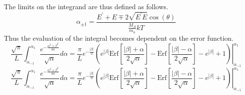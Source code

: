 The limits on the integrand are thus defined as follows.
\begin{equation}
\label{app_alpha_limits}
\alpha_{\pm 1} = \frac{E^\prime + E \mp 2\sqrt{E^\prime E}\cos(\theta)}{\frac{M_A}{m_n}kT}
\end{equation}
Thus the evaluation of the integral becomes dependent on the error function.
\begin{equation}
\label{app_int_ke_3}
\frac{\sqrt{\pi}}{L} \int_{\alpha_{-1}}^{\alpha_1} \frac{e^{-\frac{\alpha^2 + \beta^2}{4\alpha}}}{\sqrt{\alpha}} d\alpha = 
    \frac{\pi}{L} e^{-\frac{|\beta|}{2}} \left. \left(
    e^{|\beta|} \mbox{Erf}\left[\frac{|\beta| + \alpha}{2\sqrt{\alpha}}\right] - 
    \mbox{Erf}\left[\frac{|\beta| - \alpha}{2\sqrt{\alpha}}\right] - 
    e^{|\beta|} + 1
    \right) \right|_{\alpha_{-1}}^{\alpha_1}
\end{equation}
\begin{equation}
\label{app_int_ke_3}
\frac{\sqrt{\pi}}{L} \int_{\alpha_{-1}}^{\alpha_1} \frac{e^{-\frac{\alpha^2 + \beta^2}{4\alpha}}}{\sqrt{\alpha}} d\alpha = 
    \frac{\pi}{L} e^{-\frac{|\beta|}{2}} \left. \left(
    e^{|\beta|} \mbox{Erf}\left[\frac{|\beta| + \alpha}{2\sqrt{\alpha}}\right] - 
    \mbox{Erf}\left[\frac{|\beta| - \alpha}{2\sqrt{\alpha}}\right] - 
    e^{|\beta|} + 1
    \right) \right|_{\alpha_{-1}}^{\alpha_1}
\end{equation}
